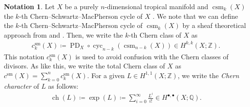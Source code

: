 \documentclass[a4paper,dvipdfmx,reqno,12pt]{amsart}
\theoremstyle{definition}
\newtheorem{notation}[theorem]{Notation}
\newcommand{\deq}{\coloneqq}
\newcommand{\opn}[1]{\operatorname{#1}}
\numberwithin{equation}{section}
\begin{document}
\begin{notation}
Let $X$ be a purely $n$-dimensional tropical manifold
and $\opn{csm}_{k}(X)$ the $k$-th
Chern--Schwartz--MacPherson cycle of $X$
\cite[Definition 3.4]{demedrano2023chern}.
We note that we can define
the $k$-th Chern--Schwartz--MacPherson
cycle of $\opn{csm}_{k}(X)$ by a sheaf
theoretical approach  
from \cite[Proposition 3.11 and Lemma 3.12]{demedrano2023chern}
and \cite[Lemma 4.13]{MR4637248}.
Then, we write the $k$-th Chern class of $X$ as
\begin{align}
c_{k}^{\mathrm{sm}}(X)\deq
\opn{PD}_X\circ \opn{cyc}_{n-k}(\opn{csm}_{n-k}(X))
\in H^{k,k}(X;\mathbb{Z}).
\end{align}
This notation $c_{k}^{\mathrm{sm}}(X)$
is used to avoid confusion with the Chern classes of divisors.
As like this, we write the total Chern class of $X$ as
$c^{\mathrm{sm}}(X)=\sum_{k=0}^{n} c_{k}^{\mathrm{sm}}(X)$.
For a given $L\in H^{1,1}(X;\mathbb{Z})$, we write
the \emph{Chern character} of $L$ as follows:
\begin{align}
\opn{ch}(L)\deq \opn{exp}(L)
\deq \sum_{i=0}^{\infty}\frac{L^{i}}{i!}\in 
H^{\bullet,\bullet}(X;\mathbb{ Q}).
\end{align}
\end{notation}
\end{document}
